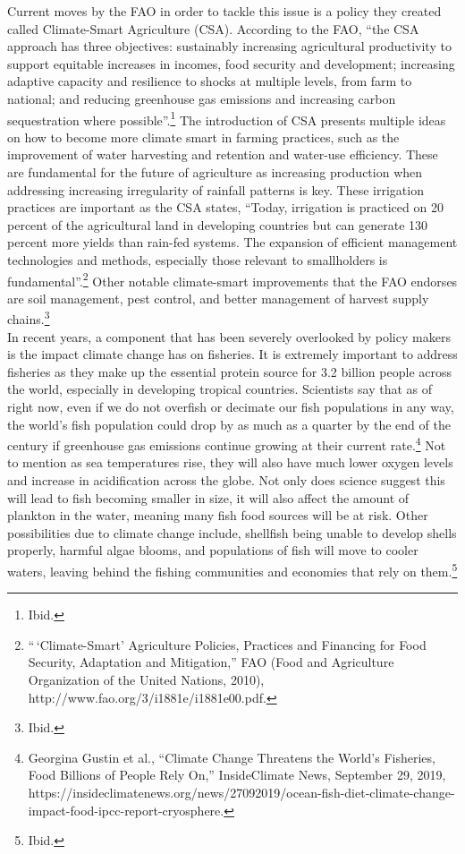 \documentclass[10pt, letterpaper]{article}
\begin{document}
Current moves by the FAO in order to tackle this issue is a policy they
created called Climate-Smart Agriculture (CSA). According to the FAO,
``the CSA approach has three objectives: sustainably increasing
agricultural productivity to support equitable increases in incomes,
food security and development; increasing adaptive capacity and
resilience to shocks at multiple levels, from farm to national; and
reducing greenhouse gas emissions and increasing carbon sequestration
where possible''.\footnote{Ibid.} The introduction of CSA presents
multiple ideas on how to become more climate smart in farming practices,
such as the improvement of water harvesting and retention and water-use
efficiency. These are fundamental for the future of agriculture as
increasing production when addressing increasing irregularity of
rainfall patterns is key. These irrigation practices are important as
the CSA states, ``Today, irrigation is practiced on 20 percent of the
agricultural land in developing countries but can generate 130 percent
more yields than rain-fed systems. The expansion of efficient management
technologies and methods, especially those relevant to smallholders is
fundamental''.\footnote{``\,`Climate-Smart' Agriculture Policies,
  Practices and Financing for Food Security, Adaptation and
  Mitigation,'' FAO (Food and Agriculture Organization of the United
  Nations, 2010), http://www.fao.org/3/i1881e/i1881e00.pdf.} Other
notable climate-smart improvements that the FAO endorses are soil
management, pest control, and better management of harvest supply
chains.\footnote{Ibid.} \\

In recent years, a component that has been severely overlooked by policy
makers is the impact climate change has on fisheries. It is extremely
important to address fisheries as they make up the essential protein
source for 3.2 billion people across the world, especially in developing
tropical countries. Scientists say that as of right now, even if we do
not overfish or decimate our fish populations in any way, the world's
fish population could drop by as much as a quarter by the end of the
century if greenhouse gas emissions continue growing at their current
rate.\footnote{Georgina Gustin et al., ``Climate Change Threatens the
  World's Fisheries, Food Billions of People Rely On,'' InsideClimate
  News, September 29, 2019,
  https://insideclimatenews.org/news/27092019/ocean-fish-diet-climate-change-impact-food-ipcc-report-cryosphere.}
Not to mention as sea temperatures rise, they will also have much lower
oxygen levels and increase in acidification across the globe. Not only
does science suggest this will lead to fish becoming smaller in size, it
will also affect the amount of plankton in the water, meaning many fish
food sources will be at risk. Other possibilities due to climate change
include, shellfish being unable to develop shells properly, harmful
algae blooms, and populations of fish will move to cooler waters,
leaving behind the fishing communities and economies that rely on
them.\footnote{Ibid.} \\
\end{document}
